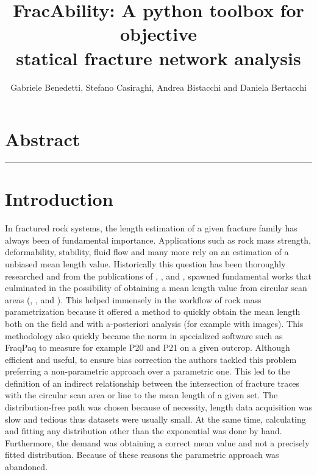 \documentclass[11pt]{article}
\title{FracAbility: A python toolbox for objective \\statical fracture network analysis}
\author{Gabriele Benedetti, Stefano Casiraghi, Andrea Bistacchi and Daniela Bertacchi}
\date{}
\begin{document}
	\maketitle
	\section*{Abstract}
	
	\rule{\textwidth}{0.1mm}

	\section{Introduction}
		In fractured rock systems, the length estimation of a given fracture family has always been of fundamental importance. Applications such as rock mass strength, deformability, stability, fluid flow and many more rely on an estimation of a unbiased mean length value. Historically this question has been thoroughly researched and from the publications of \cite{terzaghiSourcesErrorJoint1965}, \cite{warburtonStereologicalInterpretationJoint1980}, \cite{pahlEstimatingMeanLength1981} and \cite{laslettSurvivalCurveMonotone1982}, spawned fundamental works that culminated in the possibility of obtaining a mean length value from circular scan areas (\cite{mauldonEstimatingMeanFracture1998}, \cite{zhangEstimatingMeanTrace1998}, \cite{mauldonCircularScanlinesCircular2001} and \cite{rohrbaughEstimatingFractureTrace2002}). This helped immensely in the workflow of rock mass parametrization because it offered a method to quickly obtain the mean length both on the field and with a-posteriori analysis (for example with images). This methodology also quickly became the norm in specialized software such as FraqPaq \parencite{healyFracPaQMATLABToolbox2017} to measure for example P20 and P21 on a given outcrop. 
		Although efficient and useful, to ensure bias correction the authors tackled this problem preferring a non-parametric approach over a parametric one. This led to the definition of an indirect relationship between the intersection of fracture traces with the circular scan area or line to the mean length of a given set. The distribution-free path was chosen because of necessity, length data acquisition was slow and tedious thus datasets were usually small. At the same time, calculating and fitting any distribution other than the exponential \parencite{baecherProgressivelyCensoredSampling1980} was done by hand. Furthermore, the demand was obtaining a correct mean value and not a precisely fitted distribution. Because of these reasons the parametric approach was abandoned.
\end{document}
